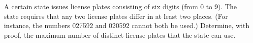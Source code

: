 A certain state issues license plates consisting of six digits (from 0 to 9).  The state requires that any two license plates differ in at least two places.  (For instance, the numbers 027592 and 020592 cannot both be used.)  Determine, with proof, the maximum number of distinct license plates that the state can use.
